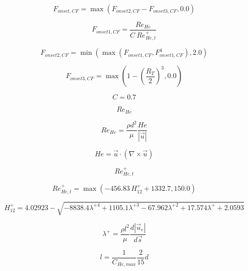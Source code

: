 

\begin{equation}
F_{onset,CF} = \max\left(F_{onset2,CF} - F_{onset3,CF}, 0.0\right)
\end{equation}

\begin{equation}
F_{onset1,CF} = \frac{Re_{He}}{C\ Re_{He,t}^{+}}
\end{equation}

\begin{equation}
F_{onset2,CF} = \min\left(\max\left(F_{onset1,CF}, F_{onset1,CF}^4\right), 2.0\right)
\end{equation}

\begin{equation}
F_{onset3,CF} = \max\left(1 - \left(\frac{R_T}{2}\right)^3, 0.0\right)
\end{equation}

\begin{equation}
C = 0.7
\end{equation}

\begin{equation}
Re_{He}
\end{equation}

\begin{equation}
Re_{He} = \frac{\rho d^2}{\mu}
\frac{He}{\left|\vec{u}\right|}
\end{equation}

\begin{equation}
He = \vec{u} \cdot \left( \nabla \times \vec{u}\right)
\end{equation}

\begin{equation}
Re_{He,t}^{+}
\end{equation}

\begin{equation}
Re_{He,t}^{+} = \max\left(-456.83\, H_{12}^{+} + 1332.7, 150.0\right)
\end{equation}

\begin{equation}
{H}_{12}^{+} = 4.02923 - \sqrt{-8838.4 \lambda^{+4} + 1105.1 \lambda^{+3} - 67.962
\lambda^{+2} + 17.574 \lambda^{+} + 2.0593}
\end{equation}

\begin{equation}
\lambda^{+} = \frac{\rho l^{2}}{\mu} \frac{d\left|\vec{u}_{e}\right|}{d\vec{s}}
\end{equation}

\begin{equation}
l = \frac{1}{C_{He,max}} \frac{2}{15} d
\end{equation}

